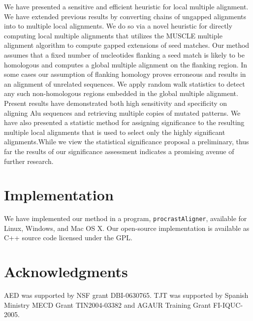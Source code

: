 \documentclass{ws-procs9x6}
\begin{document}
We have presented a sensitive and efficient heuristic for local multiple alignment.
We have extended previous results by converting chains of ungapped alignments into to multiple local alignments. We do so via a novel heuristic for directly computing local multiple alignments that utilizes the MUSCLE multiple alignment algorithm to compute gapped extensions of seed matches.  Our method assumes that a fixed number of nucleotides flanking a seed match is likely to be homologous and computes a global multiple alignment on the flanking region.  In some cases our assumption of flanking homology proves erroneous and results in an alignment of unrelated sequences.  We apply random walk statistics to detect any such non-homologous regions embedded in the global multiple alignment.
Present results have demonstrated both high sensitivity and specificity on aligning Alu
sequences and retrieving multiple copies of mutated patterns. We have also presented a statistic method for assigning significance to the resulting multiple local alignments that is used to select only the highly significant alignments.While we view the statistical significance proposal a preliminary, thus far the results of our significance assessment indicates a promising avenue of further research.

\section{Implementation}
We have implemented our method in a program, \texttt{procrastAligner}, available for Linux, Windows, and Mac OS X. Our open-source implementation is available as C++ source code licensed under the GPL.

\section{ Acknowledgments }
AED was supported by NSF grant DBI-0630765. TJT was
supported by Spanish Ministry MECD Grant TIN2004-03382 and AGAUR
Training Grant FI-IQUC-2005.




\end{document}

